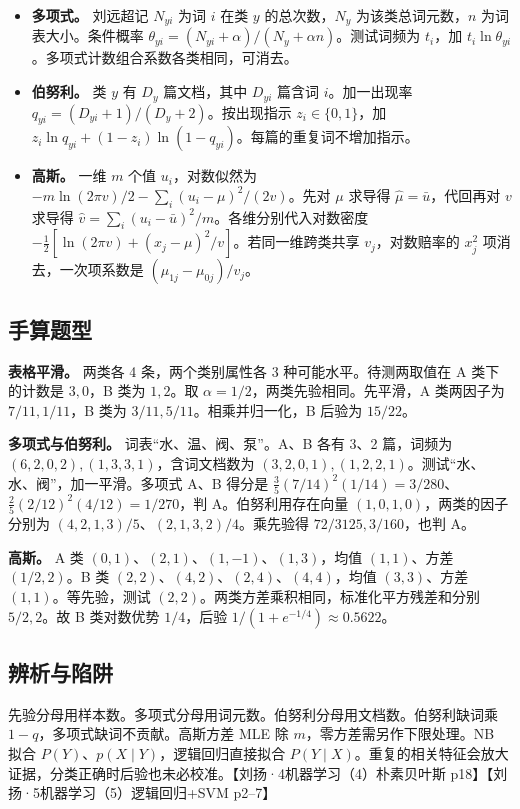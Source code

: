 \documentclass[UTF8,a4paper,zihao=-4,fontset=fandol]{ctexart}
\begin{document}
\begin{itemize}[nosep]
\item \textbf{多项式。} 刘远超记 \(N_{yi}\) 为词 \(i\) 在类 \(y\) 的总次数，\(N_y\) 为该类总词元数，\(n\) 为词表大小。条件概率 \(\theta_{yi}=(N_{yi}+\alpha)/(N_y+\alpha n)\)。测试词频为 \(t_i\)，加 \(t_i\ln\theta_{yi}\)。多项式计数组合系数各类相同，可消去。
\item \textbf{伯努利。} 类 \(y\) 有 \(D_y\) 篇文档，其中 \(D_{yi}\) 篇含词 \(i\)。加一出现率 \(q_{yi}=(D_{yi}+1)/(D_y+2)\)。按出现指示 \(z_i\in\{0,1\}\)，加 \(z_i\ln q_{yi}+(1-z_i)\ln(1-q_{yi})\)。每篇的重复词不增加指示。
\item \textbf{高斯。} 一维 \(m\) 个值 \(u_i\)，对数似然为 \(-m\ln(2\pi v)/2-\sum_i(u_i-\mu)^2/(2v)\)。先对 \(\mu\) 求导得 \(\hat\mu=\bar u\)，代回再对 \(v\) 求导得 \(\hat v=\sum_i(u_i-\bar u)^2/m\)。各维分别代入对数密度 \(-\tfrac12[\ln(2\pi v)+(x_j-\mu)^2/v]\)。若同一维跨类共享 \(v_j\)，对数赔率的 \(x_j^2\) 项消去，一次项系数是 \((\mu_{1j}-\mu_{0j})/v_j\)。
\end{itemize}

\subsection{手算题型}
\textbf{表格平滑。} 两类各 4 条，两个类别属性各 3 种可能水平。待测两取值在 A 类下的计数是 \(3,0\)，B 类为 \(1,2\)。取 \(\alpha=1/2\)，两类先验相同。先平滑，A 类两因子为 \(7/11,1/11\)，B 类为 \(3/11,5/11\)。相乘并归一化，B 后验为 \(15/22\)。

\textbf{多项式与伯努利。} 词表“水、温、阀、泵”。A、B 各有 3、2 篇，词频为 \((6,2,0,2),(1,3,3,1)\)，含词文档数为 \((3,2,0,1),(1,2,2,1)\)。测试“水、水、阀”，加一平滑。多项式 A、B 得分是 \(\frac35(7/14)^2(1/14)=3/280\)、\(\frac25(2/12)^2(4/12)=1/270\)，判 A。伯努利用存在向量 \((1,0,1,0)\)，两类的因子分别为 \((4,2,1,3)/5\)、\((2,1,3,2)/4\)。乘先验得 \(72/3125,3/160\)，也判 A。

\textbf{高斯。} A 类 \((0,1)\)、\((2,1)\)、\((1,-1)\)、\((1,3)\)，均值 \((1,1)\)、方差 \((1/2,2)\)。B 类 \((2,2)\)、\((4,2)\)、\((2,4)\)、\((4,4)\)，均值 \((3,3)\)、方差 \((1,1)\)。等先验，测试 \((2,2)\)。两类方差乘积相同，标准化平方残差和分别 \(5/2,2\)。故 B 类对数优势 \(1/4\)，后验 \(1/(1+e^{-1/4})\approx0.5622\)。

\subsection{辨析与陷阱}
先验分母用样本数。多项式分母用词元数。伯努利分母用文档数。伯努利缺词乘 \(1-q\)，多项式缺词不贡献。高斯方差 MLE 除 \(m\)，零方差需另作下限处理。NB 拟合 \(P(Y)\)、\(p(X\mid Y)\)，逻辑回归直接拟合 \(P(Y\mid X)\)。重复的相关特征会放大证据，分类正确时后验也未必校准。【刘扬·4机器学习（4）朴素贝叶斯 p18】【刘扬·5机器学习（5）逻辑回归+SVM p2–7】
\end{document}
